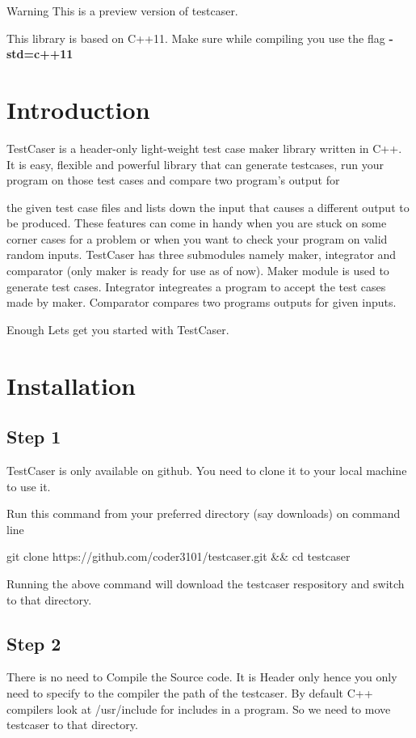 \begin{DoxyWarning}{Warning}
This is a preview version of testcaser.

This library is based on C++11. Make sure while compiling you use the flag {\bfseries -\/std=c++11}
\end{DoxyWarning}
\hypertarget{index_sec_intro}{}\section{Introduction}\label{index_sec_intro}
\begin{DoxyVerb}TestCaser is a header-only light-weight test case maker library written in
C++. It is easy, flexible and powerful library that can generate testcases,
run your program on those test cases and compare two program's output for
\end{DoxyVerb}
 the given test case files and lists down the input that causes a different output to be produced. These features can come in handy when you are stuck on some corner cases for a problem or when you want to check your program on valid random inputs. Test\+Caser has three submodules namely maker, integrator and comparator (only maker is ready for use as of now). Maker module is used to generate test cases. Integrator integreates a program to accept the test cases made by maker. Comparator compares two program\textquotesingle{}s outputs for given inputs.

Enough Let\textquotesingle{}s get you started with Test\+Caser.\hypertarget{index_sec_install}{}\section{Installation}\label{index_sec_install}
\hypertarget{index_step1}{}\subsection{Step 1}\label{index_step1}
Test\+Caser is only available on github. You need to clone it to your local machine to use it.

Run this command from your preferred directory (say downloads) on command line 
\begin{DoxyCode}
git clone https://github.com/coder3101/testcaser.git && cd testcaser
\end{DoxyCode}
 Running the above command will download the testcaser respository and switch to that directory.\hypertarget{index_step2}{}\subsection{Step 2}\label{index_step2}
There is no need to Compile the Source code. It is Header only hence you only need to specify to the compiler the path of the testcaser. By default C++ compilers look at {\ttfamily /usr/include} for includes in a program. So we need to move testcaser to that directory.

